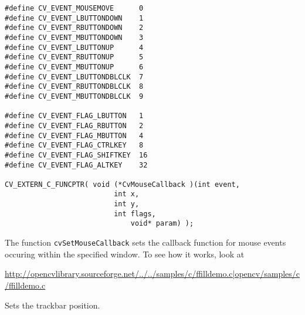 \begin{lstlisting}
#define CV_EVENT_MOUSEMOVE      0
#define CV_EVENT_LBUTTONDOWN    1
#define CV_EVENT_RBUTTONDOWN    2
#define CV_EVENT_MBUTTONDOWN    3
#define CV_EVENT_LBUTTONUP      4
#define CV_EVENT_RBUTTONUP      5
#define CV_EVENT_MBUTTONUP      6
#define CV_EVENT_LBUTTONDBLCLK  7
#define CV_EVENT_RBUTTONDBLCLK  8
#define CV_EVENT_MBUTTONDBLCLK  9

#define CV_EVENT_FLAG_LBUTTON   1
#define CV_EVENT_FLAG_RBUTTON   2
#define CV_EVENT_FLAG_MBUTTON   4
#define CV_EVENT_FLAG_CTRLKEY   8
#define CV_EVENT_FLAG_SHIFTKEY  16
#define CV_EVENT_FLAG_ALTKEY    32

CV_EXTERN_C_FUNCPTR( void (*CvMouseCallback )(int event, 
					      int x, 
					      int y, 
					      int flags, 
				              void* param) );
\end{lstlisting}

\begin{description}
\end{description}

The function \texttt{cvSetMouseCallback} sets the callback function for mouse events occuring within the specified window. To see how it works, look at 

\url{http://opencvlibrary.sourceforge.net/../../samples/c/ffilldemo.c|opencv/samples/c/ffilldemo.c} 

Sets the trackbar position.


